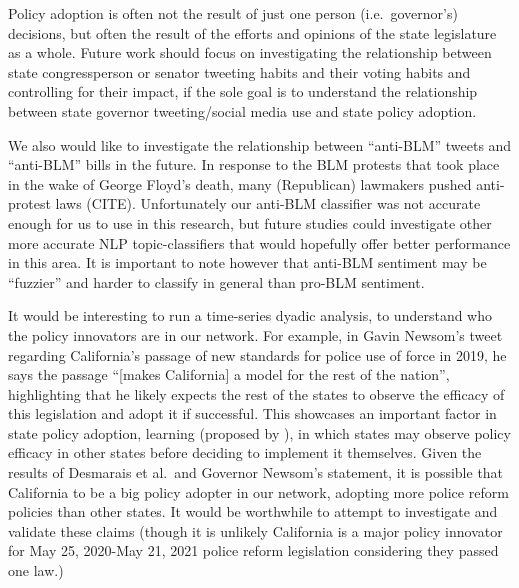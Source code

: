 \documentclass[12pt]{article}
\begin{document}
Policy adoption is often not the result of just one person
(i.e.~governor's) decisions, but often the result of the efforts and
opinions of the state legislature as a whole. Future work should focus
on investigating the relationship between state congressperson or
senator tweeting habits and their voting habits and controlling for
their impact, if the sole goal is to understand the relationship between
state governor tweeting/social media use and state policy adoption.

We also would like to investigate the relationship between ``anti-BLM''
tweets and ``anti-BLM'' bills in the future. In response to the BLM
protests that took place in the wake of George Floyd's death, many
(Republican) lawmakers pushed anti-protest laws (CITE). Unfortunately
our anti-BLM classifier was not accurate enough for us to use in this
research, but future studies could investigate other more accurate NLP
topic-classifiers that would hopefully offer better performance in this
area. It is important to note however that anti-BLM sentiment may be
``fuzzier'' and harder to classify in general than pro-BLM sentiment.

It would be interesting to run a time-series dyadic analysis, to
understand who the policy innovators are in our network. For example, in
Gavin Newsom's tweet regarding California's passage of new standards for
police use of force in 2019, he says the passage ``{[}makes
California{]} a model for the rest of the nation'', highlighting that he
likely expects the rest of the states to observe the efficacy of this
legislation and adopt it if successful. This showcases an important
factor in state policy adoption, learning (proposed by \citet{Shipan}),
in which states may observe policy efficacy in other states before
deciding to implement it themselves. Given the results of Desmarais et
al.~and Governor Newsom's statement, it is possible that California to
be a big policy adopter in our network, adopting more police reform
policies than other states. It would be worthwhile to attempt to
investigate and validate these claims (though it is unlikely California
is a major policy innovator for May 25, 2020-May 21, 2021 police reform
legislation considering they passed one law.)



\end{document}
